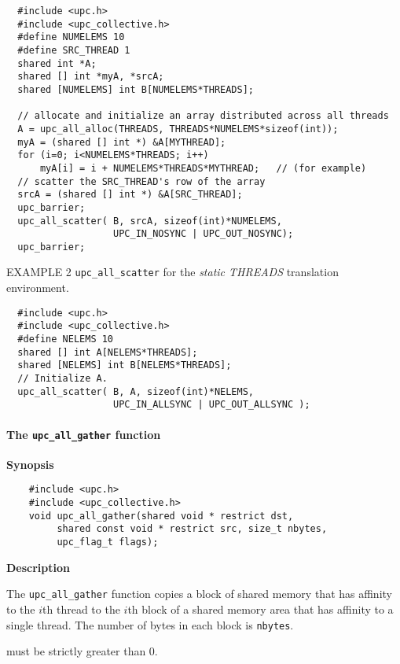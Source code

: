 \begin{verbatim}
  #include <upc.h>
  #include <upc_collective.h>
  #define NUMELEMS 10
  #define SRC_THREAD 1
  shared int *A;
  shared [] int *myA, *srcA;
  shared [NUMELEMS] int B[NUMELEMS*THREADS];

  // allocate and initialize an array distributed across all threads
  A = upc_all_alloc(THREADS, THREADS*NUMELEMS*sizeof(int));
  myA = (shared [] int *) &A[MYTHREAD];
  for (i=0; i<NUMELEMS*THREADS; i++)
      myA[i] = i + NUMELEMS*THREADS*MYTHREAD;   // (for example)
  // scatter the SRC_THREAD's row of the array
  srcA = (shared [] int *) &A[SRC_THREAD];
  upc_barrier;
  upc_all_scatter( B, srcA, sizeof(int)*NUMELEMS,
                   UPC_IN_NOSYNC | UPC_OUT_NOSYNC);
  upc_barrier;
\end{verbatim}

\np EXAMPLE 2 {\tt upc\_all\_scatter} for the {\em static THREADS} 
translation environment.

\begin{verbatim}
  #include <upc.h>
  #include <upc_collective.h>
  #define NELEMS 10
  shared [] int A[NELEMS*THREADS];
  shared [NELEMS] int B[NELEMS*THREADS];
  // Initialize A.
  upc_all_scatter( B, A, sizeof(int)*NELEMS,
                   UPC_IN_ALLSYNC | UPC_OUT_ALLSYNC );
\end{verbatim}

\paragraph{The {\tt upc\_all\_gather} function}

{\bf Synopsis} 

\npf\vspace{-2.5em} 

\begin{verbatim}
    #include <upc.h>
    #include <upc_collective.h>
    void upc_all_gather(shared void * restrict dst,
         shared const void * restrict src, size_t nbytes,
         upc_flag_t flags);
\end{verbatim}

{\bf Description} 

\np The {\tt upc\_all\_gather} function copies a block of shared memory
that has affinity to the $i$th thread to the $i$th block
of a shared memory area that has affinity to a single thread.
The number of bytes in each block is {\tt nbytes}.

 must be strictly greater than 0.

